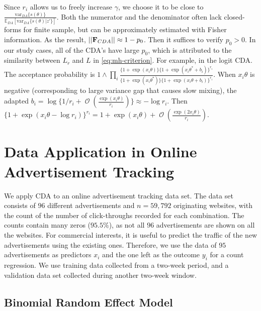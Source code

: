 \documentclass[10pt]{article}
\newcommand{\xbeta}{ x_i \theta}
\newcommand{\bb}[1]{\mathbb{#1}}
\newcommand{\mc}[1]{\mathcal{#1}}
\DeclareMathOperator{\bigO}{\mc O}
\begin{document}
Since $r_i$ allows us to freely increase $\gamma$, we choose it to be close to $\frac{\mbox{var}_{DA}\{s(\theta) \} } {\bb E_{DA}  [  \mbox{var}_{DA}\{ s(\theta)|z'\}]}$. Both the numerator and the denominator often lack closed-forms for finite sample, but can be approximately estimated with Fisher information. As the result, $||{\bf F}_{CDA}||\approx 1 - p_0$. Then it suffices to verify $p_0>0$. In our study cases, all of the CDA's have large $p_0$, which is attributed to the similarity between $L_r$ and $L$ in \eqref{eq:mh-criterion}. For example, in the logit CDA. The acceptance probability is $1\wedge \prod_i\frac{ \{1+\exp(\xbeta)\}   \{1+\exp(\xbeta^*+b_i)\}^{r_i} } {  \{1+\exp(\xbeta^*)\}  \{1+\exp(\xbeta+b_i)\}^{r_i}    }$. When $\xbeta$ is negative (corresponding to large variance gap that causes slow mixing), the adapted $b_i  = \log\{ 1/r_{i} + \bigO (\frac{\exp(\xbeta)}{r_i} )\} \approx -\log r_i$. Then $\{ 1+\exp(\xbeta-\log r_i)\}^{r_i} = 1+\exp(\xbeta) + \bigO(\frac{\exp(2\xbeta) }{r_i})$.


\section{Data Application in Online Advertisement Tracking}

We apply CDA to an online advertisement tracking data set.  The data set consists of $96$ different advertisements and $n=59,792$ originating websites, with the count of the number of click-throughs recorded for each combination.  The counts contain many zeros ($95.5\%$), as not all $96$ advertisements are shown on all the websites. For commercial interests, it is useful  to predict the traffic of the new advertisements using the existing ones. Therefore, we use the data of $95$ advertisements as predictors $x_i$ and the one left as the outcome $y_i$ for a count regression. We use training data collected from a two-week period, and a validation data set collected during another two-week window. 

\subsection{Binomial Random Effect Model}
\end{document}
